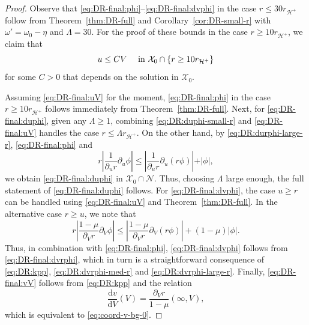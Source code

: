 \documentclass[10pt, reqno]{amsart}
\theoremstyle{definition}
\theoremstyle{remark}
\theoremstyle{conjecture}
\numberwithin{equation}{section}
\newcommand{\abs}[1]{\vert#1\vert}
\newcommand{\set}[1]{\{#1\}}
\newcommand{\ud}{\mathrm{d}}
\newcommand{\rd}{\partial}
\newcommand{\0}{\emptyset}
\newcommand{\Lmb}{\Lambda}
\newcommand{\omg}{\omega}
\newcommand{\calH}{\mathcal H}
\newcommand{\calN}{\mathcal N}
\newcommand{\calX}{\mathcal X}
\newcommand{\EH}{\calH^{+}}
\newcommand{\Abs}[1]{\left\vert #1 \right\vert}
\begin{document}
\begin{proof}
Observe that \eqref{eq:DR-final:phi}--\eqref{eq:DR-final:dvphi} in the case $r \leq 30 r_{\EH}$ follow from Theorem~\ref{thm:DR-full} and Corollary~\ref{cor:DR-small-r} with $\omg' = \omg_{0} - \eta$ and $\Lmb = 30$. For the proof of these bounds in the case $r \geq 10 r_{\EH}$, we claim that
\begin{equation} \label{eq:DR-final:uV}
	u \leq C V \quad \hbox{ in } \calX_{0} \cap \set{r \geq 10 r_{\EH}}
\end{equation}
for some $C > 0$ that depends on the solution in $\calX_{0}$. 

Assuming \eqref{eq:DR-final:uV} for the moment, \eqref{eq:DR-final:phi} in the case $r \geq 10 r_{\EH}$ follows immediately from Theorem~\ref{thm:DR-full}. 
Next, for \eqref{eq:DR-final:duphi}, given any $\Lmb \geq 1$, combining \eqref{eq:DR:duphi-small-r} and \eqref{eq:DR-final:uV} handles the case $r \leq \Lmb r_{\EH}$. On the other hand, by \eqref{eq:DR:durphi-large-r}, \eqref{eq:DR-final:phi} and
\begin{equation*}
	r \Abs{\frac{1}{\rd_{u} r} \rd_{u} \phi}
	\leq \Abs{\frac{1}{\rd_{u} r} \rd_{u} (r \phi)} + \abs{\phi},
\end{equation*}
we obtain \eqref{eq:DR-final:duphi} in $\calX_{0} \cap \calN$. Thus, choosing $\Lmb$ large enough, the full statement of \eqref{eq:DR-final:duphi} follows.
For \eqref{eq:DR-final:dvphi}, the case $u \geq r$ can be handled using \eqref{eq:DR-final:uV} and Theorem~\ref{thm:DR-full}. In the alternative case $r \geq u$, we note that
\begin{equation*}
	r \Abs{\frac{1-\mu}{\rd_{V} r} \rd_{V} \phi}
	\leq \Abs{\frac{1-\mu}{\rd_{V} r} \rd_{V} (r \phi)} + (1 - \mu)\Abs{\phi}.
\end{equation*}
Thus, in combination with \eqref{eq:DR-final:phi}, \eqref{eq:DR-final:dvphi} follows from \eqref{eq:DR-final:dvrphi}, which in turn is a straightforward consequence of \eqref{eq:DR:kpp}, \eqref{eq:DR:dvrphi-med-r} and \eqref{eq:DR:dvrphi-large-r}. Finally, \eqref{eq:DR-final:vV} follows from \eqref{eq:DR:kpp} and the relation
\begin{equation*}
	\frac{\ud v}{\ud V}(V) =  \frac{\rd_{V} r}{1-\mu}(\infty, V),
\end{equation*}
which is equivalent to \eqref{eq:coord-v-bg-0}.


\end{proof}
\end{document}
